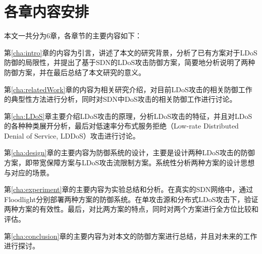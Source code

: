 \section{各章内容安排}
\label{sec:arrange}
本文一共分为6章，各章节的主要内容如下：

第\ref{cha:intro}章的内容为引言，讲述了本文的研究背景，分析了已有方案对于LDoS防御的局限性，并提出了基于SDN的LDoS攻击防御方案，简要地分析说明了两种防御方案，并在最后总结了本文研究的意义。

第\ref{cha:relatedWork}章的内容为相关研究介绍，对目前LDoS攻击的相关防御工作的典型性方法进行分析，同时对SDN中DoS攻击的相关防御工作进行讨论。

第\ref{cha:LDoS}章主要介绍LDoS攻击的原理，分析LDoS攻击的特征，并且对LDoS的各种种类展开分析，最后对低速率分布式服务拒绝（Low-rate Distributed Denial of Service, LDDoS）攻击进行讨论。

第\ref{cha:design}章的主要内容为防御系统的设计，主要是设计两种LDoS攻击的防御方案，即带宽保障方案与LDoS攻击流限制方案。系统性分析两种方案的设计思想与对应的场景。

第\ref{cha:experiment}章的主要内容为实验总结和分析。在真实的SDN网络中，通过Floodlight分别部署两种方案的防御系统。在单攻击源和分布式LDoS攻击下，验证两种方案的有效性。最后，对比两方案的特点，同时对两个方案进行全方位比较和评估。

第\ref{cha:conclusion}章的主要内容为对本文的防御方案进行总结，并且对未来的工作进行探讨。
